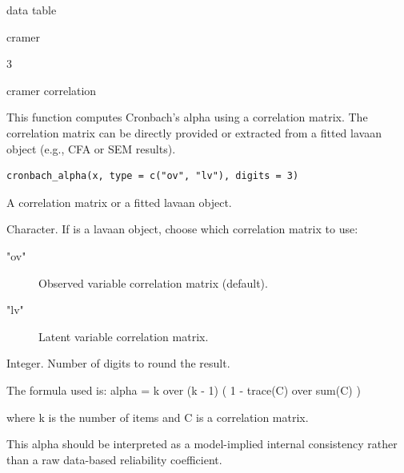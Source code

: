 \documentclass[a4paper]{book}
\begin{document}
%
\begin{Arguments}
\begin{ldescription}
\item[\code{data}] data table

\item[\code{type}] cramer

\item[\code{digits}] 3
\end{ldescription}
\end{Arguments}
%
\begin{Value}
cramer correlation
\end{Value}
%
\begin{Description}
This function computes Cronbach's alpha using a correlation matrix.
The correlation matrix can be directly provided or extracted from a
fitted lavaan object (e.g., CFA or SEM results).
\end{Description}
%
\begin{Usage}
\begin{verbatim}
cronbach_alpha(x, type = c("ov", "lv"), digits = 3)
\end{verbatim}
\end{Usage}
%
\begin{Arguments}
\begin{ldescription}
\item[\code{x}] A correlation matrix or a fitted lavaan object.

\item[\code{type}] Character. If  is a lavaan object, choose which
correlation matrix to use:
\begin{description}

\item["ov"] Observed variable correlation matrix (default).
\item["lv"] Latent variable correlation matrix.

\end{description}


\item[\code{digits}] Integer. Number of digits to round the result.
\end{ldescription}
\end{Arguments}
%
\begin{Details}
The formula used is:
alpha = k over (k - 1) ( 1 - trace(C) over sum(C) )

where k is the number of items and C is a correlation matrix.

This alpha should be interpreted as a model-implied internal consistency
rather than a raw data-based reliability coefficient.
\end{Details}
\end{document}
